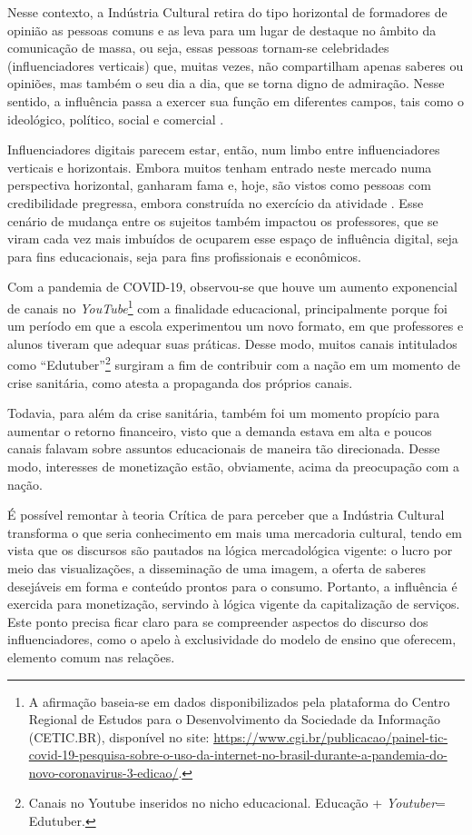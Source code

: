 \documentclass[portuguese]{textolivre}
\begin{document}
Nesse contexto, a Indústria Cultural retira do tipo horizontal de formadores de opinião as pessoas comuns e as leva para um lugar de destaque no âmbito da comunicação de massa, ou seja, essas pessoas tornam-se celebridades (influenciadores verticais) que, muitas vezes, não compartilham apenas saberes ou opiniões, mas também o seu dia a dia, que se torna digno de admiração. Nesse sentido, a influência passa a exercer sua função em diferentes campos, tais como o ideológico, político, social e comercial \cite{resende_professores_2020}.

Influenciadores digitais parecem estar, então, num limbo entre influenciadores verticais e horizontais. Embora muitos tenham entrado neste mercado numa perspectiva horizontal, ganharam fama e, hoje, são vistos como pessoas com credibilidade pregressa, embora construída no exercício da atividade \cite{resende_professores_2020}.  Esse cenário de mudança entre os sujeitos também impactou os professores, que se viram cada vez mais imbuídos de ocuparem esse espaço de influência digital, seja para fins educacionais, seja para fins profissionais e econômicos. 

Com a pandemia de COVID-19, observou-se que houve um aumento exponencial de canais no \textit{YouTube}\footnote{A afirmação baseia-se em dados disponibilizados pela plataforma do Centro Regional de Estudos para o Desenvolvimento da Sociedade da Informação (CETIC.BR), disponível no site:  \url{https://www.cgi.br/publicacao/painel-tic-covid-19-pesquisa-sobre-o-uso-da-internet-no-brasil-durante-a-pandemia-do-novo-coronavirus-3-edicao/}.} com a finalidade educacional, principalmente porque foi um período em que a escola experimentou um novo formato, em que professores e alunos tiveram que adequar suas práticas. Desse modo, muitos canais intitulados como “Edutuber”\footnote{Canais no Youtube inseridos no nicho educacional. Educação + \textit{Youtuber}= Edutuber.} surgiram a fim de contribuir com a nação em um momento de crise sanitária, como atesta a propaganda dos próprios canais.

Todavia, para além da crise sanitária, também foi um momento propício para aumentar o retorno financeiro, visto que a demanda estava em alta e poucos canais falavam sobre assuntos educacionais de maneira tão direcionada. Desse modo, interesses de monetização estão, obviamente, acima da preocupação com a nação.

É possível remontar à teoria Crítica de \textcite{adorno_dialetica_1985} para perceber que a Indústria Cultural transforma o que seria conhecimento em mais uma mercadoria cultural, tendo em vista que os discursos são pautados na lógica mercadológica vigente: o lucro por meio das visualizações, a disseminação de uma imagem, a oferta de saberes desejáveis em forma e conteúdo prontos para o consumo. Portanto, a influência é exercida para monetização, servindo à lógica vigente da capitalização de serviços. Este ponto precisa ficar claro para se compreender aspectos do discurso dos influenciadores, como o apelo à exclusividade do modelo de ensino que oferecem, elemento comum nas relações.
\end{document}

